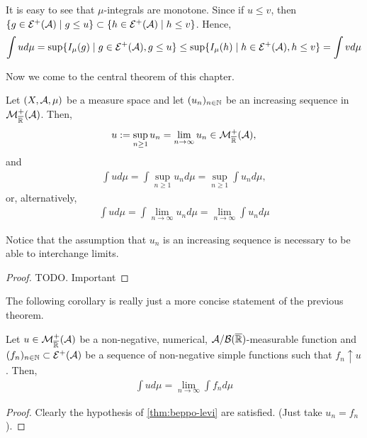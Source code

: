 \begin{remark}
	\label{rem:mu-integrals-monotone}
	It is easy to see that $\mu$-integrals are monotone. Since if $u \leq v$, then $\{g \in \mathcal{E}^+(\mathcal{A}) \mid g \leq u\} \subset \{h \in \mathcal{E}^+(\mathcal{A}) \mid h \leq v\}$. Hence,
	\begin{align*}
		\int u d\mu = \sup \{I_\mu(g) \mid g \in \mathcal{E}^+(\mathcal{A}), g \leq u\} \leq \sup \{I_\mu(h) \mid h \in \mathcal{E}^+(\mathcal{A}), h \leq v\} = \int v d\mu
	\end{align*}
\end{remark}

Now we come to the central theorem of this chapter.

\begin{thm}
	\label{thm:beppo-levi}
	Let $(X, \mathcal{A}, \mu)$ be a measure space and let $(u_n)_{n\in\mathbb{N}}$ be an increasing sequence in $\mathcal{M}^+_{\overline{\mathbb{R}}}(\mathcal{A})$. Then,
	\begin{align*}
		u := \sup_{n \geq 1} u_n = \lim_{n \to \infty} u_n \in \mathcal{M}_{\overline{\mathbb{R}}}^+(\mathcal{A}),
	\end{align*}
	and
	\begin{align}
		\int u d\mu = \int \sup_{n \geq 1} u_n d\mu = \sup_{n \geq 1} \int u_n d\mu,
	\end{align}
	or, alternatively,
	\begin{align}
		\int u d\mu = \int \lim_{n \to \infty} u_n d\mu = \lim_{n \to \infty} \int u_n d\mu
	\end{align}
\end{thm}

Notice that the assumption that $u_n$ is an increasing sequence is necessary to be able to interchange limits.

\begin{proof}
	TODO. Important
\end{proof}

The following corollary is really just a more concise statement of the previous theorem.
\begin{cor}
	\label{cor:beppo-levi}
	Let $u \in \mathcal{M}_{\overline{\mathbb{R}}}^+(\mathcal{A})$ be a non-negative, numerical, $\mathcal{A}/\mathcal{B}({\overline{\mathbb{R}}})$-measurable function and $(f_n)_{n\in\mathbb{N}} \subset \mathcal{E}^+(\mathcal{A})$ be a sequence of non-negative simple functions such that $f_n \uparrow u$. Then,
	\begin{align}
		\int u d\mu = \lim_{n \to \infty} \int f_n d\mu
	\end{align}
\end{cor}

\begin{proof}
	Clearly the hypothesis of \autoref{thm:beppo-levi} are satisfied. (Just take $u_n = f_n$).
\end{proof}

